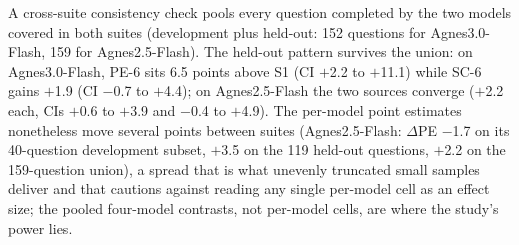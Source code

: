 A cross-suite consistency check pools every question completed by the two models covered in both suites (development plus held-out: 152 questions for Agnes3.0-Flash, 159 for Agnes2.5-Flash). The held-out pattern survives the union: on Agnes3.0-Flash, PE-6 sits 6.5 points above S1 (CI $+$2.2 to $+$11.1) while SC-6 gains $+$1.9 (CI $-$0.7 to $+$4.4); on Agnes2.5-Flash the two sources converge ($+$2.2 each, CIs $+$0.6 to $+$3.9 and $-$0.4 to $+$4.9). The per-model point estimates nonetheless move several points between suites (Agnes2.5-Flash: $\Delta$PE $-$1.7 on its 40-question development subset, $+$3.5 on the 119 held-out questions, $+$2.2 on the 159-question union), a spread that is what unevenly truncated small samples deliver and that cautions against reading any single per-model cell as an effect size; the pooled four-model contrasts, not per-model cells, are where the study's power lies.

